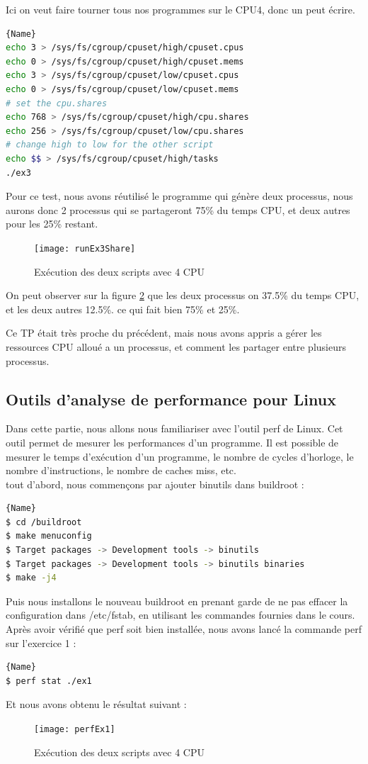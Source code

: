 \documentclass[
	a4paper, %
	10pt, %
]{CSUniSchoolLabReport}
\begin{document}
\begin{enumerate}[label=\textbf{\arabic*}]
Ici on veut faire tourner tous nos programmes sur le CPU4, donc un peut \'ecrire.
\begin{lstlisting}[language=bash, firstnumber=1]{Name}
echo 3 > /sys/fs/cgroup/cpuset/high/cpuset.cpus
echo 0 > /sys/fs/cgroup/cpuset/high/cpuset.mems
echo 3 > /sys/fs/cgroup/cpuset/low/cpuset.cpus
echo 0 > /sys/fs/cgroup/cpuset/low/cpuset.mems
# set the cpu.shares
echo 768 > /sys/fs/cgroup/cpuset/high/cpu.shares
echo 256 > /sys/fs/cgroup/cpuset/low/cpu.shares
# change high to low for the other script
echo $$ > /sys/fs/cgroup/cpuset/high/tasks 
./ex3
\end{lstlisting}
Pour ce test, nous avons réutilis\'e le programme qui g\'en\`ere deux processus, nous aurons donc 2 processus qui se partageront 75\% du temps CPU, et deux autres pour les 25\% restant.
\begin{figure}[H]
	\centering
	\texttt{[image: runEx3Share]}
	\caption{Ex\'ecution des deux scripts avec 4 CPU}
	\label{fig:runEx3Share}
\end{figure}
On peut observer sur la figure \ref{fig:runEx3Share} que les deux processus on 37.5\% du temps CPU, et les deux autres 12.5\%.
ce qui fait bien 75\% et 25\%.

Ce TP était tr\`es proche du pr\'ec\'edent, mais nous avons appris a g\'erer les ressources CPU alloué a un processus, et comment les partager entre plusieurs processus.
\end{enumerate}


\subsection{Outils d'analyse de performance pour Linux}
Dans cette partie, nous allons nous familiariser avec l'outil perf de Linux. Cet outil permet de mesurer les performances d'un programme. Il est possible de mesurer le temps d'ex\'ecution d'un programme, le nombre de cycles d'horloge, le nombre d'instructions, le nombre de caches miss, etc.\\

tout d'abord, nous commen\c{c}ons par ajouter binutils dans buildroot :
\begin{lstlisting}[language=bash, firstnumber=1]{Name}
$ cd /buildroot
$ make menuconfig
$ Target packages -> Development tools -> binutils
$ Target packages -> Development tools -> binutils binaries
$ make -j4
\end{lstlisting}

Puis nous installons le nouveau buildroot en prenant garde de ne pas effacer la configuration dans /etc/fstab, en utilisant les commandes fournies dans le cours.
Apr\`es avoir v\'erifié que perf soit bien installée, nous avons lancé la commande perf sur l'exercice 1 :
\begin{lstlisting}[language=bash, firstnumber=1]{Name}
$ perf stat ./ex1
\end{lstlisting}
Et nous avons obtenu le r\'esultat suivant :
\begin{figure}[H]
	\centering
	\texttt{[image: perfEx1]}
	\caption{Ex\'ecution des deux scripts avec 4 CPU}
	\label{fig:runEx3Share}
\end{figure}
\end{document}
